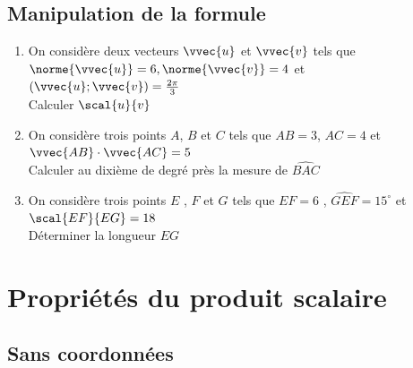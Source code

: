 \documentclass[oneside,12pt]{book}          %
\begin{document}
\subsection{Manipulation de la formule}

\begin{enumerate}
    \item On considère deux vecteurs $\vvec{u}$ et $\vvec{v}$ tels que $\norme{\vvec{u}}=6, \norme{\vvec{v}}=4$ et $(\vvec{u};\vvec{v})=\frac{2\pi}{3}$\\
    Calculer $\scal{u}{v}$
    
    \item On considère trois points $A$, $B$ et $C$ tels que $AB=3$, $AC=4$ et $\vvec{AB}\cdot\vvec{AC}=5$\\
    Calculer au dixième de degré près la mesure de $\widehat{BAC}$
    
    \item On considère trois points $E$ , $F$ et $G$ tels que $EF=6$ , $\widehat{GEF}=15^\circ$ et $\scal{EF}{EG}=18$\\
    Déterminer la longueur $EG$
\end{enumerate}



\newpage
\section{Propriétés du produit scalaire}


\subsection{Sans coordonnées}
\end{document}
